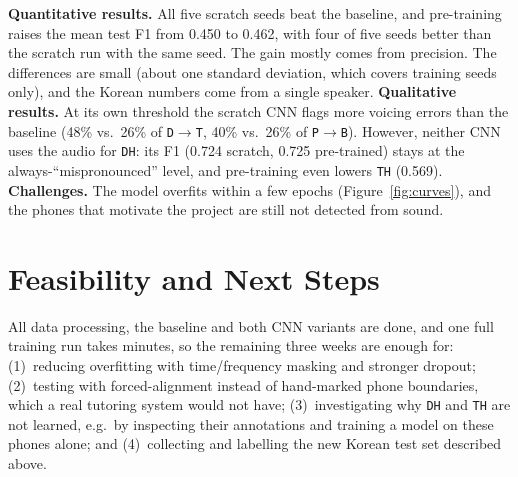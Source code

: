 \documentclass[final]{article}
\begin{document}
\textbf{Quantitative results.} All five scratch seeds beat the baseline, and pre-training raises the mean test F1
from 0.450 to 0.462, with four of five seeds better than the scratch run with the same seed. The gain mostly comes
from precision. The differences are small (about one standard deviation, which covers training seeds only), and the
Korean numbers come from a single speaker. \textbf{Qualitative results.} At its own threshold the scratch CNN flags
more voicing errors than the baseline (48\% vs.\ 26\% of \texttt{D}$\rightarrow$\texttt{T}, 40\% vs.\ 26\% of
\texttt{P}$\rightarrow$\texttt{B}). However, neither CNN uses the audio for \texttt{DH}: its F1 (0.724 scratch, 0.725
pre-trained) stays at the always-``mispronounced'' level, and pre-training even lowers \texttt{TH} (0.569).
\textbf{Challenges.} The model overfits within a few epochs (Figure~\ref{fig:curves}), and the phones that motivate
the project are still not detected from sound.

\section*{Feasibility and Next Steps}
All data processing, the baseline and both CNN variants are done, and one full training run takes minutes, so the
remaining three weeks are enough for: (1)~reducing overfitting with time/frequency masking and stronger dropout;
(2)~testing with forced-alignment instead of hand-marked phone boundaries, which a real tutoring system would not
have; (3)~investigating why \texttt{DH} and \texttt{TH} are not learned, e.g.\ by inspecting their annotations and
training a model on these phones alone; and (4)~collecting and labelling the new Korean test set described above.

\newpage


\end{document}
